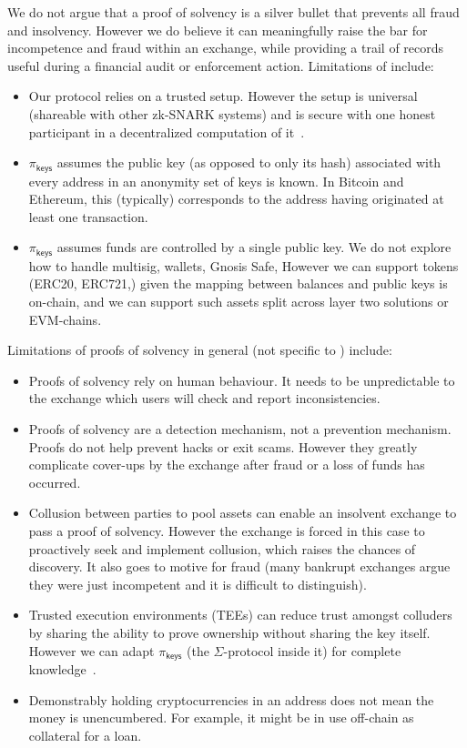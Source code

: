 We do not argue that a proof of solvency is a silver bullet that prevents all fraud and insolvency. However we do believe it can meaningfully raise the bar for incompetence and fraud within an exchange, while providing a trail of records useful during a financial audit or enforcement action. Limitations of \Sys include: 

\begin{itemize}
\item Our protocol relies on a trusted setup. However the setup is universal (shareable with other zk-SNARK systems) and is secure with one honest participant in a decentralized computation of it~\cite{tau}.
\item $\pi_\mathsf{keys}$ assumes the public key (as opposed to only its hash) associated with every address in an anonymity set of keys is known. In Bitcoin and Ethereum, this (typically) corresponds to the address having originated at least one transaction. 
\item $\pi_\mathsf{keys}$ assumes funds are controlled by a single public key. We do not explore how to handle multisig, wallets, Gnosis Safe, \etc However we can support tokens (\eg ERC20, ERC721,\etc) given the mapping between balances and public keys is on-chain, and we can support such assets split across layer two solutions or EVM-chains. 
\end{itemize}

Limitations of proofs of solvency in general (not specific to \Sys) include:

\begin{itemize}
\item Proofs of solvency rely on human behaviour. It needs to be unpredictable to the exchange which users will check and report inconsistencies.
\item Proofs of solvency are a detection mechanism, not a prevention mechanism. Proofs do not help prevent hacks or exit scams. However they greatly complicate cover-ups by the exchange after fraud or a loss of funds has occurred.
\item Collusion between parties to pool assets can enable an insolvent exchange to pass a proof of solvency. However the exchange is forced in this case to proactively seek and implement collusion, which raises the chances of discovery. It also goes to motive for fraud (many bankrupt exchanges argue they were just incompetent and it is difficult to distinguish). 
\item Trusted execution environments (TEEs) can reduce trust amongst colluders by sharing the ability to prove ownership without sharing the key itself. However we can adapt $\pi_\mathsf{keys}$ (the $\Sigma$-protocol inside it) for complete knowledge~\cite{completeknowledge}.
\item Demonstrably holding cryptocurrencies in an address does not mean the money is unencumbered. For example, it might be in use off-chain as collateral for a loan. 
\end{itemize}

